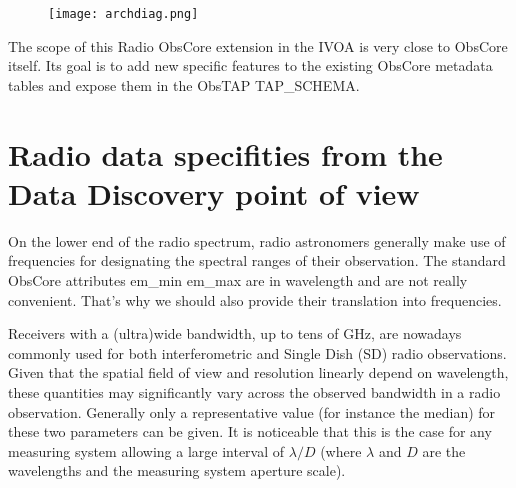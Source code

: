 \documentclass[11pt,a4paper]{ivoa}
\begin{document}


\begin{figure}[H]
\centering

\texttt{[image: archdiag.png]}
\label{fig:architecture}
\end{figure}


The scope of this Radio ObsCore extension in the IVOA is very close to ObsCore itself. 
Its goal is to add new specific features to the existing ObsCore metadata tables and expose 
them in the ObsTAP TAP\_SCHEMA. 





\section{Radio data specifities from the Data Discovery point of view}
\label{sec:specificities}

On the lower end of the radio spectrum, radio astronomers generally make use of 
frequencies for designating the spectral ranges of their observation. The standard 
ObsCore attributes em\_min em\_max  are in wavelength and are not really convenient. 
That's why we should also provide their translation into frequencies. 
        
Receivers with a (ultra)wide bandwidth, up to tens of GHz, are 
nowadays commonly used for both interferometric and Single Dish (SD) radio observations. 
Given that the spatial field of view and resolution linearly depend on wavelength, these quantities may significantly vary across the observed bandwidth in a radio observation. 
Generally only a representative value (for instance the median) for these two parameters can be given. It is 
noticeable that this is the case for any measuring system allowing a large interval of 
$\lambda/D$ (where $\lambda$ and $D$ are the wavelengths and the measuring system
aperture scale).
 
\end{document}
